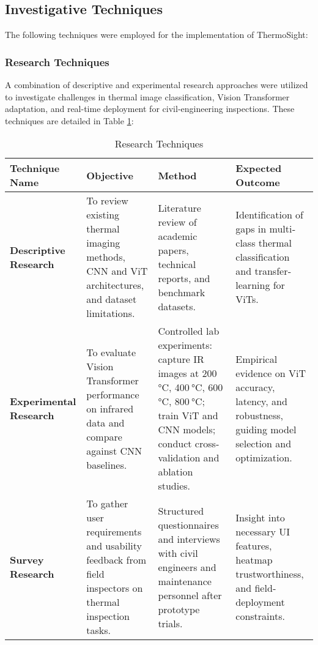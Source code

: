 \subsection{Investigative Techniques}
The following techniques were employed for the implementation of ThermoSight:

\subsubsection*{Research Techniques}
A combination of descriptive and experimental research approaches were utilized to investigate challenges in thermal image classification, Vision Transformer adaptation, and real-time deployment for civil‐engineering inspections. These techniques are detailed in Table \ref{tab:ts_research_techniques}:

\begin{table}[H]
	\centering
	\fontsize{10}{12}\selectfont
	\caption{Research Techniques}
	\label{tab:ts_research_techniques}
	\begin{tabularx}{\textwidth}{|l|X|X|X|}
		\hline
		\textbf{Technique Name}             & \textbf{Objective}                                                                                   & \textbf{Method}                                                                                              & \textbf{Expected Outcome} \\ \hline
		\textbf{Descriptive Research}       & To review existing thermal imaging methods, CNN and ViT architectures, and dataset limitations.      & Literature review of academic papers, technical reports, and benchmark datasets.                              & Identification of gaps in multi‐class thermal classification and transfer‐learning for ViTs.   \\ \hline
		\textbf{Experimental Research}      & To evaluate Vision Transformer performance on infrared data and compare against CNN baselines.      & Controlled lab experiments: capture IR images at 200 °C, 400 °C, 600 °C, 800 °C; train ViT and CNN models; conduct cross‐validation and ablation studies. & Empirical evidence on ViT accuracy, latency, and robustness, guiding model selection and optimization. \\ \hline
		\textbf{Survey Research}            & To gather user requirements and usability feedback from field inspectors on thermal inspection tasks.  & Structured questionnaires and interviews with civil engineers and maintenance personnel after prototype trials. & Insight into necessary UI features, heatmap trustworthiness, and field‐deployment constraints. \\ \hline
	\end{tabularx}
\end{table}

